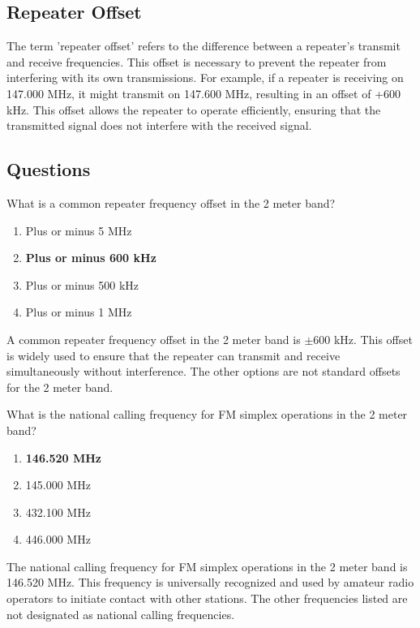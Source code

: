 \subsection*{Repeater Offset}
The term 'repeater offset' refers to the difference between a repeater's transmit and receive frequencies. This offset is necessary to prevent the repeater from interfering with its own transmissions. For example, if a repeater is receiving on 147.000 MHz, it might transmit on 147.600 MHz, resulting in an offset of +600 kHz. This offset allows the repeater to operate efficiently, ensuring that the transmitted signal does not interfere with the received signal.

\subsection*{Questions}

\begin{tcolorbox}[colback=gray!10!white,colframe=black!75!black,title={T2A01}]
What is a common repeater frequency offset in the 2 meter band?
\begin{enumerate}[label=\Alph*),noitemsep]
    \item Plus or minus 5 MHz
    \item \textbf{Plus or minus 600 kHz}
    \item Plus or minus 500 kHz
    \item Plus or minus 1 MHz
\end{enumerate}
\end{tcolorbox}
A common repeater frequency offset in the 2 meter band is $\pm 600$ kHz. This offset is widely used to ensure that the repeater can transmit and receive simultaneously without interference. The other options are not standard offsets for the 2 meter band.

\begin{tcolorbox}[colback=gray!10!white,colframe=black!75!black,title={T2A02}]
What is the national calling frequency for FM simplex operations in the 2 meter band?
\begin{enumerate}[label=\Alph*),noitemsep]
    \item \textbf{146.520 MHz}
    \item 145.000 MHz
    \item 432.100 MHz
    \item 446.000 MHz
\end{enumerate}
\end{tcolorbox}
The national calling frequency for FM simplex operations in the 2 meter band is 146.520 MHz. This frequency is universally recognized and used by amateur radio operators to initiate contact with other stations. The other frequencies listed are not designated as national calling frequencies.


